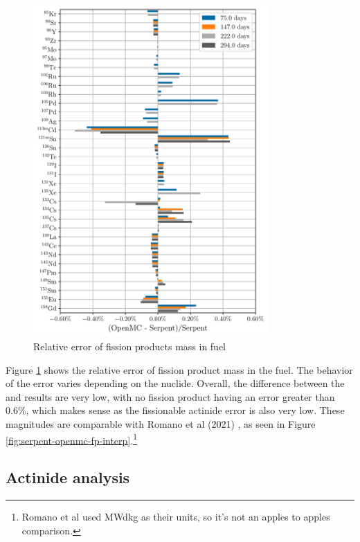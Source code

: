 \begin{figure}[htpb]
    \centering
    \includegraphics[width=0.8\textwidth]{figs/ch5/fission_products.pdf}
    \caption{Relative error of fission products mass in fuel}
    \label{fig:fission-products}
\end{figure}

Figure \ref{fig:fission-products} shows the relative error of fission product
mass in the fuel. The behavior of the error varies depending on the nuclide.
Overall, the difference between the \OpenMC and \SerpentTWO results are
very low, with no fission product having an error greater than 0.6\%, 
which makes sense as the fissionable actinide error is also very low. These
magnitudes are comparable with Romano et al (2021) \cite{romano_depletion_2021}, 
as seen in Figure \ref{fig:serpent-openmc-fp-interp}.\footnote{Romano
et al used MWd\/kg as their units, so it's not an apples to apples comparison.}


\subsection{Actinide analysis}
\label{sub:actinide-analysis}

